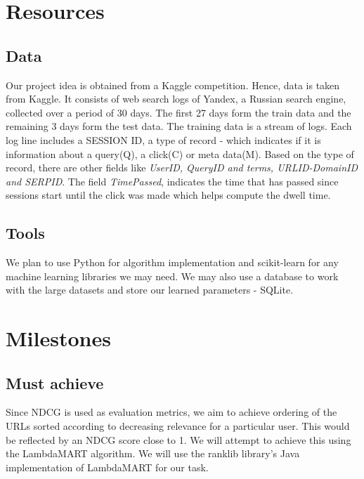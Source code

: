 \documentclass[11pt]{article}
\begin{document}
\section{Resources}
\subsection{Data}
Our project idea is obtained from a Kaggle competition. Hence, data is taken from Kaggle. It consists of web search logs of Yandex, a Russian search engine, collected over a period of 30 days. The first 27 days form the train data and the remaining 3 days form the test data. \newline
The training data is a stream of logs. Each log line includes a SESSION ID, a type of record  - which indicates if it is information about a query(Q), a click(C) or meta data(M). Based on the type of record, there are other fields like \textsl{UserID, QueryID and terms, URLID-DomainID and SERPID}. The field \textsl{TimePassed}, indicates the time that has passed since sessions start until the click was made which helps compute the dwell time.

\subsection{Tools}
We plan to use Python for algorithm implementation and scikit-learn for any machine learning libraries we may need. We may also use a database to work with the large datasets and store our learned parameters - SQLite.

\section{Milestones}
\subsection{Must achieve}
Since NDCG is used as evaluation metrics, we aim to achieve ordering of the URLs sorted according to decreasing relevance for a particular user. This would be reflected by an NDCG score close to 1. We will attempt to achieve this using the LambdaMART algorithm. We will use the ranklib library's Java implementation of LambdaMART for our task. 
\end{document}
